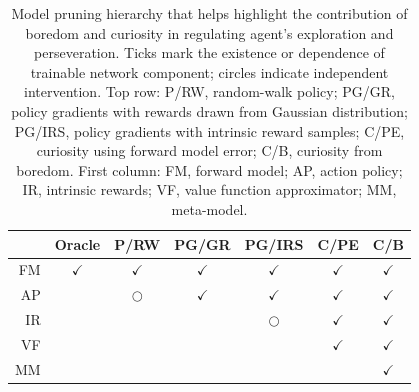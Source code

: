\documentclass[utf8]{frontiersSCNS}
\begin{document}
\begin{table}[bh!]
	\begin{center}
	\caption{Model pruning hierarchy that helps highlight the contribution of boredom and curiosity in regulating agent's exploration and perseveration. Ticks mark the existence or dependence of trainable network component; circles indicate independent intervention. Top row: P/RW, random-walk policy; PG/GR, policy gradients with rewards drawn from Gaussian distribution; PG/IRS, policy gradients with intrinsic reward samples; C/PE, curiosity using forward model error; C/B, curiosity from boredom. First column: FM, forward model; AP, action policy;  IR, intrinsic rewards; VF, value function approximator; MM, meta-model.}
	\label{tab:model-prune}
	\begin{tabular}{r c c c c c c}
	\toprule
	& Oracle & P/RW & PG/GR & PG/IRS & C/PE & C/B \\ 
	\midrule
	FM & $\checkmark$ & $\checkmark$ & $\checkmark$ & $\checkmark$ & $\checkmark$ & $\checkmark$ \\ 
	AP &  & $\bigcirc$  & $\checkmark$ & $\checkmark$ & $\checkmark$ & $\checkmark$ \\ 
	IR &  &  &  & $\bigcirc$ & $\checkmark$ & $\checkmark$ \\ 
	VF &  &  &  &  & $\checkmark$ & $\checkmark$ \\ 
	MM &  &  &  &  &  & $\checkmark$ \\ 
	\bottomrule
	\end{tabular} 
	\end{center}
\end{table}
\end{document}
